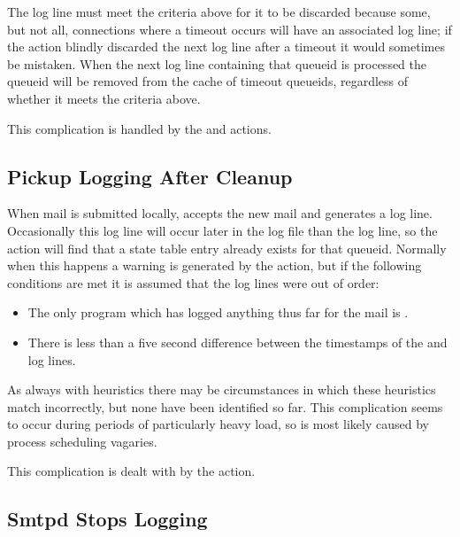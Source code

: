The  log line must meet the criteria above for it to be
discarded because some, but not all, connections where a timeout occurs
will have an associated  log line; if the
 action blindly discarded the next
 log line after a timeout it would sometimes be mistaken.
When the next  log line containing that queueid is processed
the queueid will be removed from the cache of timeout queueids, regardless
of whether it meets the criteria above.

This complication is handled by the  and
 actions.

\subsection{Pickup Logging After Cleanup}

\label{pickup logging after cleanup}

When mail is submitted locally,  accepts the new mail and
generates a log line.  Occasionally this log line will occur later in the
log file than the  log line, so the  action
will find that a state table entry already exists for that queueid.
Normally when this happens a warning is generated by the 
action, but if the following conditions are met it is assumed that the log
lines were out of order:

\begin{itemize}

    \item The only program which has logged anything thus far for the mail
        is .

    \item There is less than a five second difference between the
        timestamps of the  and  log lines.

\end{itemize}

As always with heuristics there may be circumstances in which these
heuristics match incorrectly, but none have been identified so far.  This
complication seems to occur during periods of particularly heavy load, so
is most likely caused by process scheduling vagaries.

This complication is dealt with by the  action.

\subsection{Smtpd Stops Logging}

